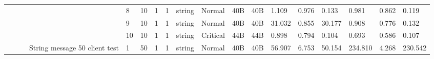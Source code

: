 \begin{landscape}
\begin{table}[]
{\begin{tabular}{@{}ccccllllllllllllll@{}}
                                                                                   &                              &                                &                                                                                                          & 8                                                     & 10                                       & 1                                          & 1                                 & string                           & Normal                             & 40B                                           & 40B                                             & 1.109                   & 0.976    & 0.133                        & 0.981                   & 0.862    & 0.119                        \\
                                                                                   &                              &                                &                                                                                                          & 9                                                     & 10                                       & 1                                          & 1                                 & string                           & Normal                             & 40B                                           & 40B                                             & 31.032                  & 0.855    & 30.177                       & 0.908                   & 0.776    & 0.132                        \\
                                                                                   &                              &                                &                                                                                                          & 10                                                    & 10                                       & 1                                          & 1                                 & string                           & Critical                           & 44B                                           & 44B                                             & 0.898                   & 0.794    & 0.104                        & 0.693                   & 0.586    & 0.107                        \\
                                                                                   &                              &                                & \multirow{50}{*}{String message 50 client test}                                                          & 1                                                     & 50                                       & 1                                          & 1                                 & string                           & Normal                             & 40B                                           & 40B                                             & 56.907                  & 6.753    & 50.154                       & 234.810                 & 4.268    & 230.542                      \\

\end{tabular}}
\end{table}
\end{landscape}
